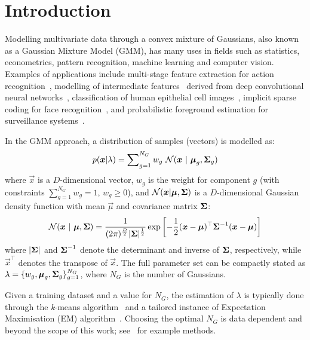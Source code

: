 \section{Introduction}

Modelling multivariate data through a convex mixture of Gaussians, also known as a Gaussian Mixture Model (GMM),
has many uses in fields such as statistics, econometrics, pattern recognition, machine learning and computer vision.
Examples of applications include
multi-stage feature extraction for action recognition~\cite{Carvajal_2016a},
modelling of intermediate features~\cite{Ge_ICIP_2015} derived from deep convolutional neural networks~\cite{Ge_2016,LeCun_Nature_2015},
classification of human epithelial cell images~\cite{Wiliem_PR_2014},
implicit sparse coding for face recognition~\cite{Wong_2014},
and probabilistic foreground estimation for surveillance systems~\cite{Reddy_2013}.

In the GMM approach, a distribution of samples (vectors) is modelled as:
%
\begin{equation}
  p({\boldsymbol{x}} | \lambda) = \sum\nolimits_{g=1}^{N_G} w_g ~ {{\mathcal{N}}}( {\boldsymbol{x}} ~|~ {\boldsymbol{\mu}}_g, {\boldsymbol{\Sigma}}_g )
  \label{eqn:gmm_prob}
\end{equation}%
%
where $\Vec{x}$ is a $D$-dimensional vector,
$w_g$ is the weight for component $g$ (with constraints $\sum\nolimits_{g=1}^{N_G} w_g = 1$, $w_g \geq 0$),
and
${{\mathcal{N}}}( {\boldsymbol{x}} | {\boldsymbol{\mu}}, {\boldsymbol{\Sigma}})$ is a $D$-dimensional Gaussian density function with mean $\Vec{\mu}$ and covariance matrix ${\boldsymbol{\Sigma}}$:
%
\begin{equation}
  {{\mathcal{N}}}( {\boldsymbol{x}} ~|~ {\boldsymbol{\mu}}, {\boldsymbol{\Sigma}} )  = 
  \frac{1}{ (2\pi)^{\frac{D}{2}} | {\boldsymbol{\Sigma}}|^{\frac{1}{2}} }
  \exp \left[ -\frac{1}{2} ({\boldsymbol{x}}-{\boldsymbol{\mu}})^\top {\boldsymbol{\Sigma}}^{-1} ({\boldsymbol{x}}-{\boldsymbol{\mu}}) \right]
  \label{eqn:gaussian}
\end{equation}%
%
where $|{\boldsymbol{\Sigma}}|$ and ${\boldsymbol{\Sigma}}^{-1}$ denote the determinant and inverse of ${\boldsymbol{\Sigma}}$, respectively,
while $\Vec{x}^\top$ denotes the transpose of $\Vec{x}$.
The full parameter set can be compactly stated as $\lambda = \{ w_g, {\boldsymbol{\mu}}_g, {\boldsymbol{\Sigma}}_g \}_{g=1}^{N_G}$,
where $N_G$ is the number of Gaussians.

Given a training dataset and a value for $N_G$,
the estimation of $\lambda$ is typically done through the {\it k}-means algorithm~\cite{Bishop_2006,Duda01,Linde80}
and a tailored instance of Expectation Maximisation (EM) algorithm~\cite{Dempster77, McLachlan-2008, Moon96, Redner84}.
Choosing the optimal $N_G$ is data dependent and beyond the scope of this work; see~\cite{Hamerly_2003,Pelleg_2000} for example methods.

